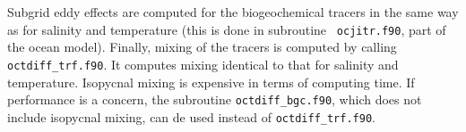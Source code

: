 \documentclass[11pt,a4paper,fleqn,twoside]{article}
\begin{document}
Subgrid eddy effects are computed for the biogeochemical tracers in the same
way as for salinity and temperature (this is done in subroutine {\tt
ocjitr.f90}, part of the ocean model).  Finally, mixing of the tracers is computed 
by calling {\tt octdiff\_trf.f90}. It computes mixing identical to that for salinity and
temperature. Isopycnal mixing is expensive in terms of computing time.  
If performance is a concern, the subroutine {\tt octdiff\_bgc.f90}, which does not 
include isopycnal mixing, can de used instead of {\tt octdiff\_trf.f90}. \\
\\






\end{document}
